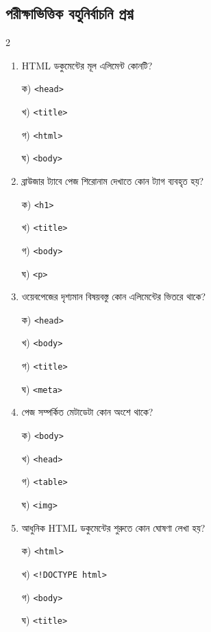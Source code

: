 \subsection{পরীক্ষাভিত্তিক বহুনির্বাচনি প্রশ্ন}

\begin{multicols}{2}
\begin{enumerate}[leftmargin=*,itemsep=5pt]
\item \begin{minipage}[t]{\linewidth}\vspace{0pt}
HTML ডকুমেন্টের মূল এলিমেন্ট কোনটি?
\par ক) \texttt{<head>}
\par খ) \texttt{<title>}
\par গ) \texttt{<html>}
\par ঘ) \texttt{<body>}
\end{minipage}

\item \begin{minipage}[t]{\linewidth}\vspace{0pt}
ব্রাউজার ট্যাবে পেজ শিরোনাম দেখাতে কোন ট্যাগ ব্যবহৃত হয়?
\par ক) \texttt{<h1>}
\par খ) \texttt{<title>}
\par গ) \texttt{<body>}
\par ঘ) \texttt{<p>}
\end{minipage}

\item \begin{minipage}[t]{\linewidth}\vspace{0pt}
ওয়েবপেজের দৃশ্যমান বিষয়বস্তু কোন এলিমেন্টের ভিতরে থাকে?
\par ক) \texttt{<head>}
\par খ) \texttt{<body>}
\par গ) \texttt{<title>}
\par ঘ) \texttt{<meta>}
\end{minipage}

\item \begin{minipage}[t]{\linewidth}\vspace{0pt}
পেজ সম্পর্কিত মেটাডেটা কোন অংশে থাকে?
\par ক) \texttt{<body>}
\par খ) \texttt{<head>}
\par গ) \texttt{<table>}
\par ঘ) \texttt{<img>}
\end{minipage}

\item \begin{minipage}[t]{\linewidth}\vspace{0pt}
আধুনিক HTML ডকুমেন্টের শুরুতে কোন ঘোষণা লেখা হয়?
\par ক) \texttt{<html>}
\par খ) \texttt{<!DOCTYPE html>}
\par গ) \texttt{<body>}
\par ঘ) \texttt{<title>}
\end{minipage}
\end{enumerate}
\end{multicols}

